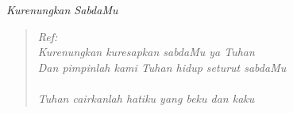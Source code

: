 \begin{center}
\itshape{Kurenungkan SabdaMu}
\end{center}

\small
\begin{verse}
\itshape{
Ref:\\
Kurenungkan kuresapkan sabdaMu ya Tuhan\\
Dan pimpinlah kami Tuhan hidup seturut sabdaMu\\
{~}\\
Tuhan cairkanlah hatiku yang beku dan kaku
}
\end{verse}
\normalsize